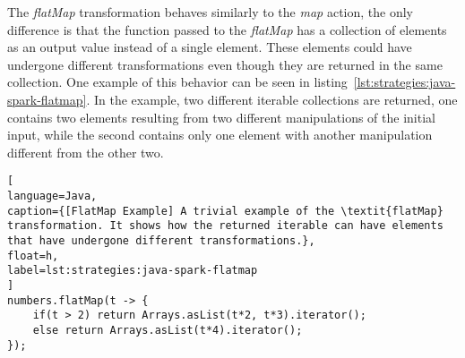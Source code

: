 

The \textit{flatMap} transformation behaves similarly to the \textit{map} action, the only difference is that the function passed to the \textit{flatMap} has a collection of elements as an output value instead of a single element. These elements could have undergone different transformations even though they are returned in the same collection. One example of this behavior can be seen in listing~\ref{lst:strategies:java-spark-flatmap}. In the example, two different iterable collections are returned, one contains two elements resulting from two different manipulations of the initial input, while the second contains only one element with another manipulation different from the other two.

\begin{lstlisting}[
language=Java,
caption={[FlatMap Example] A trivial example of the \textit{flatMap} transformation. It shows how the returned iterable can have elements that have undergone different transformations.},
float=h,
label=lst:strategies:java-spark-flatmap
]
numbers.flatMap(t -> {				
	if(t > 2) return Arrays.asList(t*2, t*3).iterator();
	else return Arrays.asList(t*4).iterator();				
});
\end{lstlisting}

